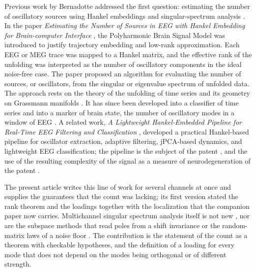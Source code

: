 \documentclass{article}
\begin{document}
Previous work by Bernadotte addressed the first question: estimating the number of oscillatory sources using Hankel embeddings and singular-spectrum analysis \cite{ref-BernadotteBuchstaber, ref-Bernadotte05}. In the paper \emph{Estimating the Number of Sources in EEG with Hankel Embedding for Brain-computer Interface} \cite{ref-Bernadotte05}, the Polyharmonic Brain Signal Model was introduced to justify trajectory embedding and low-rank approximation. Each EEG or MEG trace was mapped to a Hankel matrix, and the effective rank of the unfolding was interpreted as the number of oscillatory components in the ideal noise-free case. The paper proposed an algorithm for evaluating the number of sources, or oscillators, from the singular or eigenvalue spectrum of unfolded data. The approach rests on the theory of the unfolding of time series and its geometry on Grassmann manifolds \cite{ref-Buchstaber, ref-BuchstaberMaslov}. It has since been developed into a classifier of time series \cite{ref-Bernadotte10} and into a marker of brain state, the number of oscillatory modes in a window of EEG \cite{ref-Bernadotte07}. A related work, \emph{A Lightweight Hankel-Embedded Pipeline for Real-Time EEG Filtering and Classification} \cite{ref-Bernadotte06}, developed a practical Hankel-based pipeline for oscillator extraction, adaptive filtering, jPCA-based dynamics, and lightweight EEG classification; the pipeline is the subject of the patent \cite{pat-processing}, and the use of the resulting complexity of the signal as a measure of neurodegeneration of the patent \cite{pat-complexity}.

The present article writes this line of work for several channels at once and supplies the guarantees that the count was lacking; its first version \cite{ref-MSSAv1} stated the rank theorem and the loadings together with the localization that the companion paper now carries. Multichannel singular spectrum analysis itself is not new \cite{ref-Golyandina03, ref-Plaut}, nor are the subspace methods that read poles from a shift invariance \cite{ref-Roy, ref-Hua} or the random-matrix laws of a noise floor \cite{ref-Marchenko, ref-Yin}. The contribution is the statement of the count as a theorem with checkable hypotheses, and the definition of a loading for every mode that does not depend on the modes being orthogonal or of different strength.
\end{document}
